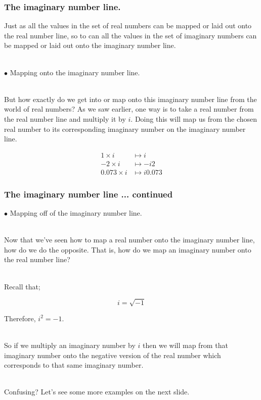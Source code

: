 \begin{frame}
\frametitle{The imaginary number line.}

Just as all the values in the set of real numbers can be mapped or laid out onto the real number line, so to can all the values in the set of imaginary numbers
can be mapped or laid out onto the imaginary number line.\\~\

\(\bullet\) Mapping onto the imaginary number line.\\~

But how exactly do we get into or map onto this imaginary number line from the world of real numbers? As we saw earlier, one way is to take a real number from
the real number line and multiply it by \(i\). Doing this will map us from the chosen real number to its corresponding imaginary number on the
imaginary number line.

\begin{align*}
1 \times i     &\mapsto i \\
-2 \times i    &\mapsto -i2 \\
0.073 \times i &\mapsto i0.073
\end{align*}

\end{frame}


\begin{frame}
\frametitle{The imaginary number line ... continued}

\(\bullet\) Mapping off of the imaginary number line.\\~

Now that we've seen how to map a real number onto the imaginary number line, how do we do the opposite. That is, how do we map an imaginary number onto the
real number line?\\~\

Recall that;

\begin{equation}
i = \sqrt{-1}
\end{equation}

Therefore, \(i^{2} = -1\).\\~\

So if we multiply an imaginary number by \(i\) then we will map from that imaginary number onto the negative version of the real number which corresponds to
that same imaginary number.\\~\

Confusing? Let's see some more examples on the next slide.

\end{frame}


